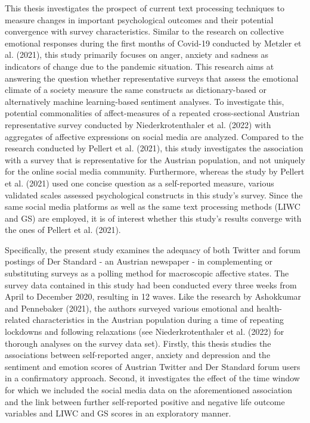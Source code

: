 \documentclass[
  english,
  jou,floatsintext]{apa7}
\begin{document}
This thesis investigates the prospect of current text processing techniques to measure changes in important psychological outcomes and their potential convergence with survey characteristics.
Similar to the research on collective emotional responses during the first months of Covid-19 conducted by Metzler et al. (2021), this study primarily focuses on anger, anxiety and sadness as indicators of change due to the pandemic situation.
This research aims at answering the question whether representative surveys that assess the emotional climate of a society measure the same constructs as dictionary-based or alternatively machine learning-based sentiment analyses. To investigate this, potential commonalities of affect-measures of a repeated cross-sectional Austrian representative survey conducted by Niederkrotenthaler et al. (2022) with aggregates of affective expressions on social media are analyzed. Compared to the research conducted by Pellert et al. (2021), this study investigates the association with a survey that is representative for the Austrian population, and not uniquely for the online social media community. Furthermore, whereas the study by Pellert et al. (2021) used one concise question as a self-reported measure, various validated scales assessed psychological constructs in this study's survey. Since the same social media platforms as well as the same text processing methods (LIWC and GS) are employed, it is of interest whether this study's results converge with the ones of Pellert et al. (2021).

Specifically, the present study examines the adequacy of both Twitter and forum postings of Der Standard - an Austrian newspaper - in complementing or substituting surveys as a polling method for macroscopic affective states. The survey data contained in this study had been conducted every three weeks from April to December 2020, resulting in 12 waves. Like the research by Ashokkumar and Pennebaker (2021), the authors surveyed various emotional and health-related characteristics in the Austrian population during a time of repeating lockdowns and following relaxations (see Niederkrotenthaler et al. (2022) for thorough analyses on the survey data set). Firstly, this thesis studies the associations between self-reported anger, anxiety and depression and the sentiment and emotion scores of Austrian Twitter and Der Standard forum users in a confirmatory approach. Second, it investigates the effect of the time window for which we included the social media data on the aforementioned association and the link between further self-reported positive and negative life outcome variables and LIWC and GS scores in an exploratory manner.
\end{document}
